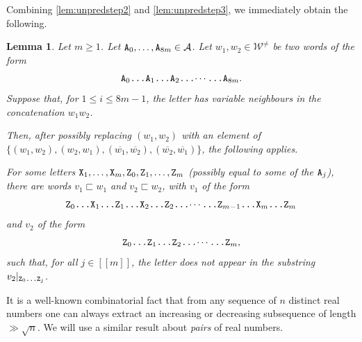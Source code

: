 \documentclass[11pt]{amsart}
\newtheorem{lemma}[theorem]{Lemma}
\theoremstyle{definition}
\renewcommand{\leq}{\leqslant}
\renewcommand{\geq}{\geqslant}
\newcommand{\sinterval}[1]{[\![#1]\!] }
\newcommand{\upletters}[1]{{\normalfont{\texttt{#1}}}}
\newcommand{\makesubscript}[1]{\textsubscript{$#1$}}
\newcommand{\word}{\mathcal{W}}
\begin{document}
Combining \cref{lem:unpredstep2} and \cref{lem:unpredstep3}, we immediately obtain the following.

\begin{lemma}
\label{lem:unpredstep4}
Let $m\geq 1$. Let $\upletters{A\makesubscript{0}}, \ldots, \upletters{A\makesubscript{8m}}\in \mathcal{A}$. Let $w_1,w_2\in \word^{\neq}$ be two words of the form
\begin{equation*}
\upletters{A\makesubscript{0}\ldots A\makesubscript{1}\ldots A\makesubscript{2}\ldots$\cdots$\ldots A\makesubscript{8m}}.
\end{equation*}
Suppose that, for $1\leq i\leq 8m-1$, the letter \upletters{A\makesubscript{i}} has variable neighbours in the concatenation $w_1w_2$. 

Then, after possibly replacing $(w_1, w_2)$ with an element of $\{(w_1, w_2), (w_2, w_1), (\overline{w_1}, \overline{w_2}), (\overline{w_2}, \overline{w_1})\}$, the following applies.

For some letters $\upletters{X\makesubscript{1}},\ldots,\upletters{X\makesubscript{m}},\upletters{Z\makesubscript{0}},\upletters{Z\makesubscript{1}},\ldots,\upletters{Z\makesubscript{m}}$ (possibly equal to some of the $\upletters{A\makesubscript{j}}$), there are words $v_1\sqsubset w_1$ and $v_2 \sqsubset w_2$, with $v_1$ of the form
\begin{equation*}
\upletters{Z\makesubscript{0}\ldots X\makesubscript{1}\ldots Z\makesubscript{1}\ldots X\makesubscript{2}\ldots Z\makesubscript{2}\ldots$\cdots$\ldots Z\makesubscript{m\!-\!1}\ldots X\makesubscript{m}\ldots Z\makesubscript{m}}
\end{equation*}
and $v_2$ of the form 
\begin{equation*}
\upletters{Z\makesubscript{0}\ldots Z\makesubscript{1}\ldots Z\makesubscript{2}\ldots$\cdots$\ldots Z\makesubscript{m}},
\end{equation*}
such that, for all $j\in \sinterval{m}$, the letter \upletters{X\makesubscript{j}} does not appear in the substring $v_2|_{\upletters{Z\makesubscript{0}\ldots Z\makesubscript{j}}}$. 
\end{lemma}

It is a well-known combinatorial fact that from any sequence of $n$ distinct real numbers one can always extract an increasing or decreasing subsequence of length $\gg \sqrt{n}$. We will use a similar result about \emph{pairs} of real numbers.
\end{document}
